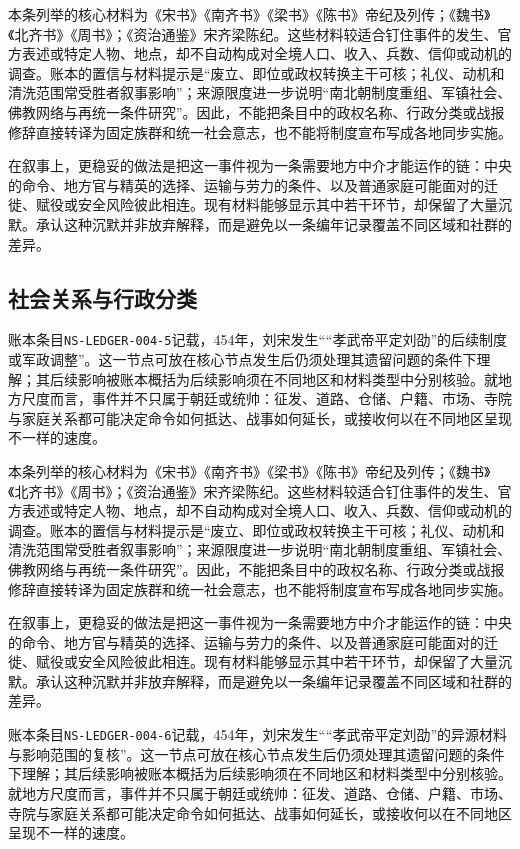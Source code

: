 本条列举的核心材料为《宋书》《南齐书》《梁书》《陈书》帝纪及列传；《魏书》《北齐书》《周书》；《资治通鉴》宋齐梁陈纪。这些材料较适合钉住事件的发生、官方表述或特定人物、地点，却不自动构成对全境人口、收入、兵数、信仰或动机的调查。账本的置信与材料提示是“废立、即位或政权转换主干可核；礼仪、动机和清洗范围常受胜者叙事影响”；来源限度进一步说明“南北朝制度重组、军镇社会、佛教网络与再统一条件研究”。因此，不能把条目中的政权名称、行政分类或战报修辞直接转译为固定族群和统一社会意志，也不能将制度宣布写成各地同步实施。

在叙事上，更稳妥的做法是把这一事件视为一条需要地方中介才能运作的链：中央的命令、地方官与精英的选择、运输与劳力的条件、以及普通家庭可能面对的迁徙、赋役或安全风险彼此相连。现有材料能够显示其中若干环节，却保留了大量沉默。承认这种沉默并非放弃解释，而是避免以一条编年记录覆盖不同区域和社群的差异。

\subsection{社会关系与行政分类}

账本条目\texttt{NS-LEDGER-004-5}记载，454年，刘宋发生““孝武帝平定刘劭”的后续制度或军政调整”。这一节点可放在核心节点发生后仍须处理其遗留问题的条件下理解；其后续影响被账本概括为后续影响须在不同地区和材料类型中分别核验。就地方尺度而言，事件并不只属于朝廷或统帅：征发、道路、仓储、户籍、市场、寺院与家庭关系都可能决定命令如何抵达、战事如何延长，或接收何以在不同地区呈现不一样的速度。

本条列举的核心材料为《宋书》《南齐书》《梁书》《陈书》帝纪及列传；《魏书》《北齐书》《周书》；《资治通鉴》宋齐梁陈纪。这些材料较适合钉住事件的发生、官方表述或特定人物、地点，却不自动构成对全境人口、收入、兵数、信仰或动机的调查。账本的置信与材料提示是“废立、即位或政权转换主干可核；礼仪、动机和清洗范围常受胜者叙事影响”；来源限度进一步说明“南北朝制度重组、军镇社会、佛教网络与再统一条件研究”。因此，不能把条目中的政权名称、行政分类或战报修辞直接转译为固定族群和统一社会意志，也不能将制度宣布写成各地同步实施。

在叙事上，更稳妥的做法是把这一事件视为一条需要地方中介才能运作的链：中央的命令、地方官与精英的选择、运输与劳力的条件、以及普通家庭可能面对的迁徙、赋役或安全风险彼此相连。现有材料能够显示其中若干环节，却保留了大量沉默。承认这种沉默并非放弃解释，而是避免以一条编年记录覆盖不同区域和社群的差异。

账本条目\texttt{NS-LEDGER-004-6}记载，454年，刘宋发生““孝武帝平定刘劭”的异源材料与影响范围的复核”。这一节点可放在核心节点发生后仍须处理其遗留问题的条件下理解；其后续影响被账本概括为后续影响须在不同地区和材料类型中分别核验。就地方尺度而言，事件并不只属于朝廷或统帅：征发、道路、仓储、户籍、市场、寺院与家庭关系都可能决定命令如何抵达、战事如何延长，或接收何以在不同地区呈现不一样的速度。

